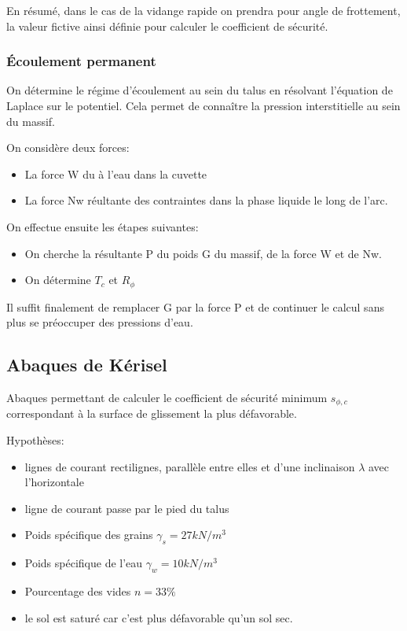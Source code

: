 En résumé, dans le cas de la vidange rapide on prendra pour angle de frottement, la valeur fictive ainsi définie pour calculer le coefficient de sécurité.

\subsubsection{Écoulement permanent}

On détermine le régime d'écoulement au sein du talus en résolvant l'équation de Laplace sur le potentiel. Cela permet de connaître la pression interstitielle au sein du massif.

On considère deux forces:
\begin{itemize}
    \item La force W du à l'eau dans la cuvette
    \item La force Nw réultante des contraintes dans la phase liquide le long de l'arc.
\end{itemize}

On effectue ensuite les étapes suivantes:
\begin{itemize}
    \item On cherche la résultante P du poids G du massif, de la force W et de Nw.
    \item On détermine $T_c$ et $R_{\phi}$
\end{itemize}

Il suffit finalement de remplacer G par la force P et de continuer le calcul sans plus se préoccuper des pressions d'eau.

\subsection{Abaques de Kérisel}

Abaques permettant de calculer le coefficient de sécurité minimum $s_{\phi,c}$ correspondant à la surface de glissement la plus défavorable.

Hypothèses: 
\begin{itemize}
    \item lignes de courant rectilignes, parallèle entre elles et d'une inclinaison $\lambda$ avec l'horizontale
    \item ligne de courant passe par le pied du talus
    \item Poids spécifique des grains $\gamma_s = 27kN/m^3$
    \item Poids spécifique de l'eau $\gamma_w = 10kN/m^3$
    \item Pourcentage des vides $n=33\%$
    \item le sol est saturé car c'est plus défavorable qu'un sol sec.
\end{itemize}

